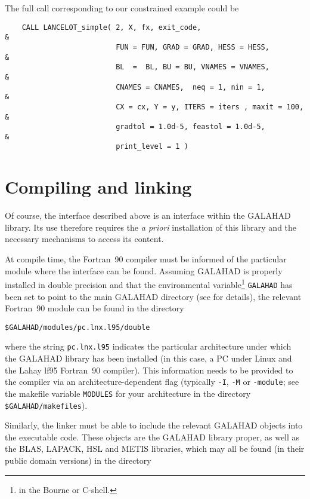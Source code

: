 \documentclass{article}
\begin{document}
The full call corresponding to our constrained example could be

\begin{lstlisting}
    CALL LANCELOT_simple( 2, X, fx, exit_code,                           &
                          FUN = FUN, GRAD = GRAD, HESS = HESS,           &
                          BL  =  BL, BU = BU, VNAMES = VNAMES,           &
                          CNAMES = CNAMES,  neq = 1, nin = 1,            &
                          CX = cx, Y = y, ITERS = iters , maxit = 100,   &
                          gradtol = 1.0d-5, feastol = 1.0d-5,            &
                          print_level = 1 )
\end{lstlisting}

\section{Compiling and linking}

Of course, the interface described above is an interface within the {\sf
GALAHAD} library.  Its use therefore requires the \emph{a priori} installation
of this library and the necessary mechanisms to access its content.

At compile time, the Fortran~90 compiler must be informed of the particular
module where the interface can be found. Assuming {\sf GALAHAD} is properly
installed in double precision and that the environmental
variable\footnote{in the Bourne or C-shell.} {\tt GALAHAD}
has been set to point to
the main {\sf GALAHAD} directory (see  for details),
the relevant Fortran~90 module can be found in the directory

\begin{lstlisting}[style=cshstyle]
    $GALAHAD/modules/pc.lnx.l95/double
\end{lstlisting}
\noindent
where the string {\tt pc.lnx.l95} indicates the particular architecture under
which the {\sf GALAHAD} library has been installed (in this case, a PC under
Linux and the Lahay lf95 Fortran~90 compiler).
This information needs to be provided to the compiler via an
architecture-dependent flag (typically {\tt -I}, {\tt -M} or {\tt -module};
see the makefile variable {\tt MODULES} for your architecture in the
directory {\tt \$GALAHAD/makefiles}).

Similarly, the linker must be able to include the relevant {\sf GALAHAD}
objects into the executable code. These objects are the {\sf GALAHAD} library
proper, as well as the BLAS, LAPACK, HSL and METIS libraries, which may all be
found (in their public domain versions) in the directory
\end{document}
